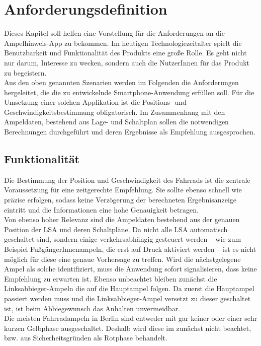 \chapter{\label{chap:anforderungen}Anforderungsdefinition}
Dieses Kapitel soll helfen eine Vorstellung für die Anforderungen an die Ampelhinweis-\gls{App} zu bekommen. Im heutigen Technologiezeitalter spielt die Benutzbarkeit und Funktionalität des Produkts eine große Rolle. Es geht nicht nur darum, Interesse zu wecken, sondern auch die NutzerInnen für das Produkt zu begeistern. \\
Aus den oben genannten Szenarien werden im Folgenden die Anforderungen hergeleitet, die die zu entwickelnde \gls{Smartphone}-Anwendung erfüllen soll. Für die Umsetzung einer solchen Applikation ist die Positions- und Geschwindigkeitsbestimmung obligatorisch. Im Zusammenhang mit den Ampeldaten, bestehend aus Lage- und Schaltplan sollen die notwendigen Berechnungen durchgeführt und deren Ergebnisse als Empfehlung ausgesprochen.
\section{Funktionalität}
Die Bestimmung der Position und Geschwindigkeit des Fahrrads ist die zentrale Voraussetzung für eine zeitgerechte Empfehlung. Sie sollte ebenso schnell wie präzise erfolgen, sodass keine Verzögerung der berechneten Ergebnisanzeige eintritt und die Informationen eine hohe Genauigkeit betragen.\\
Von ebenso hoher Relevanz sind die Ampeldaten bestehend aus der genauen Position der \gls{LSA} und deren Schaltpläne. Da nicht alle \gls{LSA} automatisch geschaltet sind, sondern einige verkehrsabhängig gesteuert werden -- wie zum Beispiel FußgängerInnenampeln, die erst auf Druck aktiviert werden -- ist es nicht möglich für diese eine genaue Vorhersage zu treffen. Wird die nächstgelegene Ampel als solche identifiziert, muss die Anwendung sofort signalisieren, dass keine Empfehlung zu erwarten ist. Ebenso unbeachtet bleiben zunächst die Linksabbieger-Ampeln die auf die Hauptampel folgen. Da zuerst die Hauptampel passiert werden muss und die Linksabbieger-Ampel versetzt zu dieser geschaltet ist, ist beim Abbiegewunsch das Anhalten unvermeidbar.\\
Die meisten Fahrradampeln in Berlin sind entweder mit gar keiner oder einer sehr kurzen Gelbphase ausgeschaltet. Deshalb wird diese im zunächst nicht beachtet, bzw. aus Sicherheitsgründen als Rotphase behandelt.
